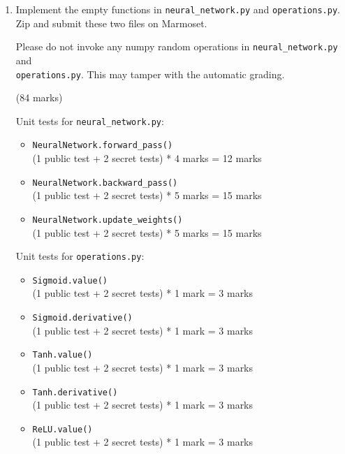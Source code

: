 \documentclass[12pt]{article}
\begin{document}
\begin{enumerate}[font=\Large,label=(\alph*)]

\item 
Implement the empty functions in \verb+neural_network.py+ and \verb+operations.py+. Zip and submit these two files on Marmoset.

Please do not invoke any numpy random operations in \verb+neural_network.py+ and \\ \verb+operations.py+. This may tamper with the automatic grading.
    
\begin{markscheme}
(84 marks)

Unit tests for \texttt{neural\_network.py}:
\begin{itemize}
    
    \item \verb+NeuralNetwork.forward_pass()+ \\
    (1 public test + 2 secret tests) * 4 marks = 12 marks
    
    \item \verb+NeuralNetwork.backward_pass()+ \\
    (1 public test + 2 secret tests) * 5 marks = 15 marks

    \item \verb+NeuralNetwork.update_weights()+ \\
    (1 public test + 2 secret tests) * 5 marks = 15 marks
\end{itemize}

Unit tests for \texttt{operations.py}:
\begin{itemize}
    
    \item \verb+Sigmoid.value()+ \\
    (1 public test + 2 secret tests) * 1 mark = 3 marks
    
    \item \verb+Sigmoid.derivative()+ \\
    (1 public test + 2 secret tests) * 1 mark = 3 marks

    \item \verb+Tanh.value()+ \\
    (1 public test + 2 secret tests) * 1 mark = 3 marks
    
    \item \verb+Tanh.derivative()+ \\
    (1 public test + 2 secret tests) * 1 mark = 3 marks

    \item \verb+ReLU.value()+ \\
    (1 public test + 2 secret tests) * 1 mark = 3 marks
    

\end{itemize}
\end{markscheme}
\end{enumerate}
\end{document}
